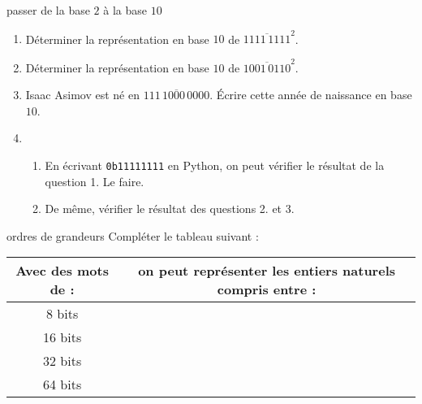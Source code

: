 \documentclass[a4paper,dvipsnames]{article}
\begin{document}
\smallskip

\begin{exercice}{passer de la base $2$ à la base $10$}{}
  \begin{enumerate}
    \item Déterminer la représentation en base $10$ de $\overline{1111\,1111}^2$.
    \item Déterminer la représentation en base $10$ de $\overline{1001\,0110}^2$.
    \item Isaac Asimov est né en $\overline{111\,1000\,0000}$. Écrire cette année de naissance en base $10$.
    \item 
      \begin{enumerate}
	\item En écrivant \texttt{0b11111111} en Python, on peut vérifier le résultat de la question 1. Le faire.
	\item De même, vérifier le résultat des questions 2. et 3.
      \end{enumerate}
  \end{enumerate} 
\end{exercice}

\smallskip

\begin{exercice}{ordres de grandeurs}{}
  Compléter le tableau suivant :
  \begin{center}
    \renewcommand{\arraystretch}{1.2}
    \begin{tabular}{@{}cc@{}}
      Avec des mots de : & on peut représenter les entiers naturels compris entre :\tabularnewline
      \midrule
      8 bits & \tabularnewline
      16 bits & \tabularnewline
      32 bits & \tabularnewline
      64 bits & \tabularnewline
    \end{tabular}
  \end{center}
\end{exercice}

\smallskip
\end{document}
